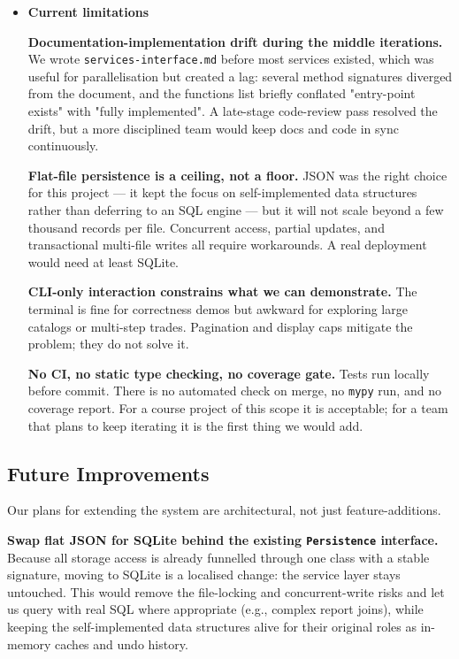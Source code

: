 \documentclass[11pt,a4paper]{article}
\begin{document}
\begin{itemize}
    \textbf{Tests that drove design, not just verified it.}
    Several architectural choices — dependency-injected \texttt{ui\_runner}, slot-level \texttt{transfer\_item}, the \texttt{stack\_size\_max} clamp — exist because tests made them necessary. The 483 tests are not a post-hoc safety net; they shaped what the production code looks like.

    \item \textbf{Current limitations}

    \textbf{Documentation-implementation drift during the middle iterations.}
    We wrote \texttt{services-interface.md} before most services existed, which was useful for parallelisation but created a lag: several method signatures diverged from the document, and the functions list briefly conflated "entry-point exists" with "fully implemented". A late-stage code-review pass resolved the drift, but a more disciplined team would keep docs and code in sync continuously.

    \textbf{Flat-file persistence is a ceiling, not a floor.}
    JSON was the right choice for this project — it kept the focus on self-implemented data structures rather than deferring to an SQL engine — but it will not scale beyond a few thousand records per file. Concurrent access, partial updates, and transactional multi-file writes all require workarounds. A real deployment would need at least SQLite.

    \textbf{CLI-only interaction constrains what we can demonstrate.}
    The terminal is fine for correctness demos but awkward for exploring large catalogs or multi-step trades. Pagination and display caps mitigate the problem; they do not solve it.

    \textbf{No CI, no static type checking, no coverage gate.}
    Tests run locally before commit. There is no automated check on merge, no \texttt{mypy} run, and no coverage report. For a course project of this scope it is acceptable; for a team that plans to keep iterating it is the first thing we would add.

\end{itemize}

\subsection{Future Improvements}

Our plans for extending the system are architectural, not just feature-additions.

\textbf{Swap flat JSON for SQLite behind the existing \texttt{Persistence} interface.}
Because all storage access is already funnelled through one class with a stable signature, moving to SQLite is a localised change: the service layer stays untouched. This would remove the file-locking and concurrent-write risks and let us query with real SQL where appropriate (e.g., complex report joins), while keeping the self-implemented data structures alive for their original roles as in-memory caches and undo history.
\end{document}
